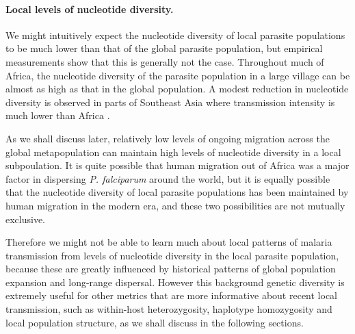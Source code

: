 \documentclass[_main.tex]{subfiles}
\begin{document}
\paragraph{Local levels of nucleotide diversity.} We might intuitively expect the nucleotide diversity of local parasite populations to be much lower than that of the global parasite population, but empirical measurements show that this is generally not the case.  Throughout much of Africa, the nucleotide diversity of the parasite population in a large village can be almost as high as that in the global population.  A modest reduction in nucleotide diversity is observed in parts of Southeast Asia where transmission intensity is much lower than Africa \cite{MalariaGEN2021,MalariaGEN2023}.  

As we shall discuss later, relatively low levels of ongoing migration across the global metapopulation can maintain high levels of nucleotide diversity in a local subpoulation.  It is quite possible that human migration out of Africa was a major factor in dispersing \textit{P. falciparum} around the world, but it is equally possible that the nucleotide diversity of local parasite populations has been maintained by human migration in the modern era, and these two possibilities are not mutually exclusive.  

Therefore we might not be able to learn much about local patterns of malaria transmission from levels of nucleotide diversity in the local parasite population, because these are greatly influenced by historical patterns of global population expansion and long-range dispersal.  However this background genetic diversity is extremely useful for other metrics that are more informative about recent local transmission, such as within-host heterozygosity, haplotype homozygosity and local population structure, as we shall discuss in the following sections.
\end{document}
